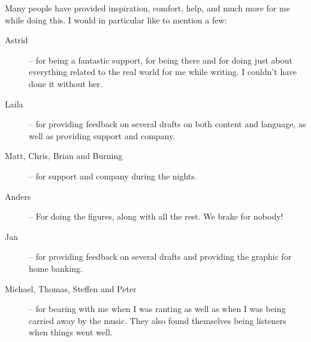 Many people have provided inspiration, comfort, help, and much more
for me while doing this.  I would in particular like to mention a few:

\begin{description}
\item[Astrid] -- for being a fantastic support, for being there and
  for doing just about everything related to the real world for me
  while writing.  I couldn't have done it without her.
  
\item[Laila] -- for providing feedback on several drafts on both
  content and language, as well as
  providing support and company.

\item[Matt, Chris, Brian and Burning] -- for support and
  company during the nights.
  
\item[Anders] -- For doing the figures, along with all the rest.  We
  brake for nobody!
  
\item[Jan] -- for providing feedback on several drafts and providing
the graphic for home banking.

\item[Michael, Thomas, Steffen and Peter] -- for bearing with me when
  I was ranting as well as when I was being carried away by the music.
   They also found themselves being listeners when things went well.  


\end{description}



